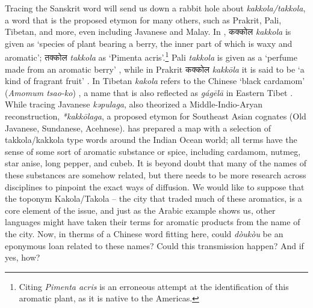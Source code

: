 \documentclass[12pt]{article}
\newcommand{\bo}[1]{\tibetanfont{#1}\rmfamily}
\newcommand{\tc}[1]{\traditionalchinesefont{#1}\rmfamily}
\newcommand{\jv}[1]{\javanesefont{#1}\rmfamily}
\begin{document}
Tracing the Sanskrit word will send us down a rabbit hole about \textit{kakkola/takkola}, a word that is the proposed etymon for many others, such as Prakrit, Pali, Tibetan, and more, even including Javanese and Malay. In \textcite[431, 241]{monier-williams_1899_sanskritenglish}, कक्कोल \textit{kakkola} is given as `species of plant bearing a berry, the inner part of which is waxy and aromatic'; तक्कोल \textit{takkola} as `Pimenta acris'.\footnote{Citing \textit{Pimenta acris} is an erroneous attempt at the identification of this aromatic plant, as it is native to the Americas.} Pali \textit{takkola} is given as a `perfume made from an aromatic berry' \parencite[292]{palitextsociety_1921_pali}, while in Prakrit कक्कोल \textit{kakkōla} it is said to be `a kind of fragrant fruit' \parencite[213]{sheth_1923_paiasaddamahannavo}. In Tibetan \bo{ཀ་ཀོ་ལ} \textit{kakola} refers to the Chinese `black cardamom' (\textit{Amomum tsao-ko}) \parencite[1]{goldstein_2001_new}, a name that is also reflected as \tc{嘎哥拉} \textit{gágēlā} in Eastern Tibet \parencite{hu_2005_food}. While tracing Javanese \textit{kəpulaga}, \textcite[417]{hoogervorst_2017_role} also theorized a Middle-Indio-Aryan reconstruction, \textit{*kakkōlaga}, a proposed etymon for Southeast Asian cognates (Old Javanese, Sundanese, Acehnese). \textcite[20]{hoogervorst_2013_southeast} has prepared a map with a selection of takkola/kakkola type words around the Indian Ocean world; all terms have the sense of some sort of aromatic substance or spice, including cardamom, nutmeg, star anise, long pepper, and cubeb. It is beyond doubt that many of the names of these substances are somehow related, but there needs to be more research across disciplines to pinpoint the exact ways of diffusion. We would like to suppose that the toponym Kakola/Takola -- the city that traded much of these aromatics, is a core element of the issue, and just as the Arabic example shows us, other languages might have taken their terms for aromatic products from the name of the city. Now, in therms of a Chinese word fitting here, could \tc{豆蔻} \textit{dòukòu} be an eponymous loan related to these names? Could this transmission happen? And if yes, how?





\end{document}
